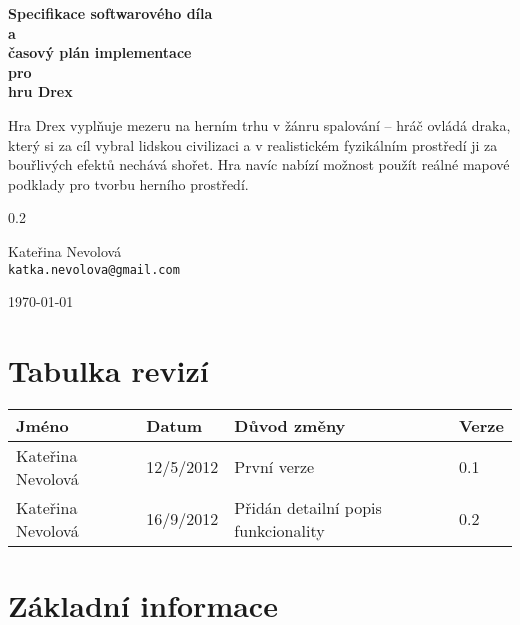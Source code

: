 \documentclass{article}
\begin{document}
\begin{titlepage}
\begin{center}

\vspace*{1cm}

{\huge \bfseries Specifikace softwarového díla \\ a \\ časový plán implementace \\ pro \\ hru Drex \\}

\vspace*{2cm}

Hra Drex vyplňuje mezeru na herním trhu v žánru spalování -- hráč ovládá draka, který si za cíl vybral lidskou civilizaci a v realistickém fyzikálním prostředí ji za bouřlivých efektů nechává shořet. Hra navíc nabízí možnost použít reálné mapové podklady pro tvorbu herního prostředí.

\vspace*{3cm}

0.2

\vspace*{2cm}

Kateřina Nevolová \\
\texttt{katka.nevolova@gmail.com}

\vfill

\today

\end{center}
\end{titlepage}


\tableofcontents
\pagebreak


\section{Tabulka revizí}

\begin{center}
\begin{tabular}{|l|l|l|l|}
\hline
Jméno & Datum & Důvod změny & Verze \\
\hline
\hline
Kateřina Nevolová & 12/5/2012 & První verze & 0.1 \\
\hline
Kateřina Nevolová & 16/9/2012 & Přidán detailní popis funkcionality & 0.2 \\
\hline
\end{tabular}
\end{center}
\pagebreak


\section{Základní informace}
\end{document}
